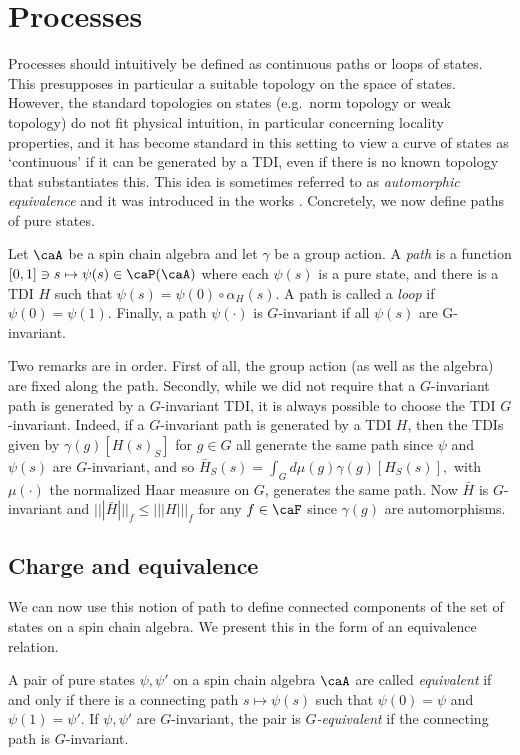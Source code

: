 \section{Processes}\label{sec: processes}

Processes should intuitively be defined as continuous paths or loops of states.  This  presupposes in particular a suitable topology on the space of states. However, the standard topologies on states (e.g.\ norm topology or weak topology) do not fit physical intuition, in particular concerning locality properties, and it has become standard in this setting to view a curve of states as `continuous' if it can be generated by a TDI, even if there is no known topology that substantiates this.  This idea is sometimes referred to as \emph{automorphic equivalence} and it was introduced in the works \cite{hastings2005quasiadiabatic,bachmann2012automorphic}.  Concretely, we now define paths of pure states.
\begin{definition}[Paths] \label{def: paths}
	Let $\caA$ be a spin chain algebra and let $\gamma$ be a group action. A \emph{path} is a function $[0,1] \ni s \mapsto \psi(s)\in\caP(\caA)$ where each $\psi(s)$ is a pure state, and there is a TDI $H$ such that $\psi(s)=\psi(0)\circ\alpha_H(s)$. A path is called a \emph{loop} if $\psi(0) = \psi(1)$.
	Finally, a path $\psi(\cdot)$ is $G$-invariant if all $\psi(s)$ are G-invariant. 
\end{definition}
Two remarks are in order. First of all, the group action (as well as the algebra) are fixed along the path. Secondly, while we did not require that a $G$-invariant path is generated by a $G$-invariant TDI, it is always possible to choose the TDI $G$-invariant. Indeed, if a $G$-invariant path is generated by a TDI $H$, then the TDIs given by $\gamma(g)[H(s)_S]$ for $g\in G$ all generate the same path since $\psi$ and $\psi(s)$ are $G$-invariant, and so
$
\bar{H}_S(s)=   \int_G d\mu(g)  \gamma(g)[H_S(s)],
$
with $\mu(\cdot)$ the normalized Haar measure on $G$, generates the same path. Now $\bar{H}$ is $G$-invariant and $|||\bar H |||_f \leq |||H|||_f$ for any $f\in \caF$ since $\gamma(g)$ are automorphisms.


\subsection{Charge and equivalence}\label{sec: equivalence}

We can now use this notion of path to define connected components of the set of states on a spin chain algebra. We present this in the form of an equivalence relation.
\begin{definition}[Equivalence]
	A pair of pure states $\psi,\psi'$  on a spin chain algebra $\caA$ are called \emph{equivalent} if and only if there is a connecting  path $s\mapsto \psi(s)$ such that $\psi(0)=\psi$ and $\psi(1)=\psi'$. If $\psi,\psi'$ are $G$-invariant, the pair is \emph{$G$-equivalent} if the connecting path is $G$-invariant. 
\end{definition}

